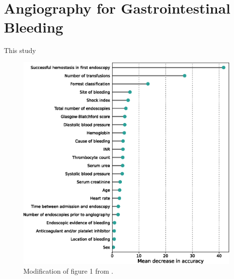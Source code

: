 
\chapter{Angiography for Gastrointestinal Bleeding}
This study




\vspace{2,5cm}

\begin{figure}[h!]
\centering
\includegraphics[width=\textwidth]{04_GraphicFiles/angiography.eps}
\caption{Modification of figure 1 from \citet{Werner2021}.}
\label{fig:angio}
\end{figure}



